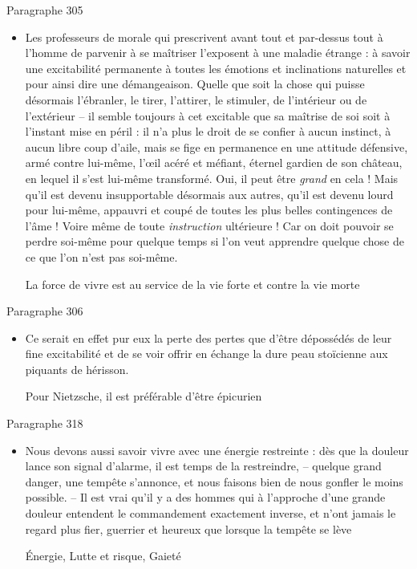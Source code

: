 \documentclass[french,a4paper,11pt,answers]{exam}
\newcommand{\cit}[2]{\og #1 \fg{} \begin{solution}{ #2 }\end{solution}} %
\begin{document}
	\begin{cadre}{Paragraphe 305}
		\begin{itemize}
			\item \cit{Les professeurs de morale qui prescrivent avant tout et par-dessus tout à l’homme de parvenir à se maîtriser l’exposent à une maladie étrange : à savoir une excitabilité permanente à toutes les émotions et inclinations naturelles et pour ainsi dire une démangeaison. Quelle que soit la chose qui puisse désormais l’ébranler, le tirer, l’attirer, le stimuler, de l’intérieur ou de l’extérieur – il semble toujours à cet excitable que sa maîtrise de soi soit à l’instant mise en péril : il n’a plus le droit de se confier à aucun instinct, à aucun libre coup d’aile, mais se fige en permanence en une attitude défensive, armé contre lui-même, l’œil acéré et méfiant, éternel gardien de son château, en lequel il s’est lui-même transformé. Oui, il peut être \emph{grand} en cela ! Mais qu’il est devenu insupportable désormais aux autres, qu’il est devenu lourd pour lui-même, appauvri et coupé de toutes les plus belles contingences de l’âme ! Voire même de toute \emph{instruction} ultérieure ! Car on doit pouvoir se perdre soi-même pour quelque temps si l’on veut apprendre quelque chose de ce que l’on n’est pas soi-même.}
				{La force de vivre est au service de la vie forte et contre la vie morte} %
		\end{itemize}
	\end{cadre}
	
	\begin{cadre}{Paragraphe 306}
		\begin{itemize}
			\item \cit{Ce serait en effet pur eux la perte des pertes que d'être dépossédés de leur fine excitabilité et de se voir offrir en échange la dure peau stoïcienne aux piquants de hérisson.}
				{Pour Nietzsche, il est préférable d'être épicurien}
		\end{itemize}
	\end{cadre}
	
	\begin{cadre}{Paragraphe 318}
		\begin{itemize}
			\item \cit{Nous devons aussi savoir vivre avec une énergie restreinte : dès que la douleur lance son signal d'alarme, il est temps de la restreindre, -- quelque grand danger, une tempête s'annonce, et nous faisons bien de nous \og gonfler \fg{} le moins possible. -- Il est vrai qu'il y a des hommes qui à l'approche d'une grande douleur entendent le commandement exactement inverse, et n'ont jamais le regard plus fier, guerrier et heureux que lorsque la tempête se lève}
				{Énergie, Lutte et risque, Gaieté}
		\end{itemize}
	\end{cadre}
\end{document}
